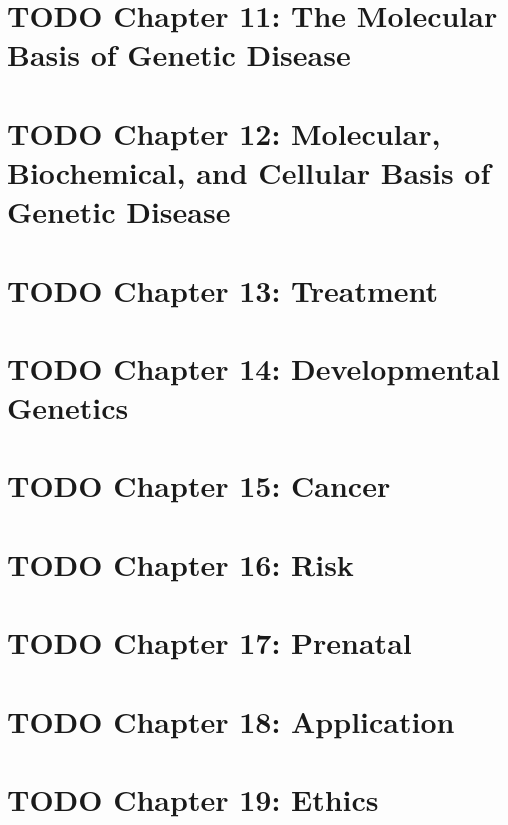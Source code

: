 \documentclass{scrartcl}
\begin{document}
\section{{\bfseries\sffamily TODO} Chapter 11: The Molecular Basis of Genetic Disease}
\label{sec:org085050b}
\section{{\bfseries\sffamily TODO} Chapter 12: Molecular, Biochemical, and Cellular Basis of Genetic Disease}
\label{sec:org5de3e22}
\section{{\bfseries\sffamily TODO} Chapter 13: Treatment}
\label{sec:orgb409f19}
\section{{\bfseries\sffamily TODO} Chapter 14: Developmental Genetics}
\label{sec:orgcb04602}
\section{{\bfseries\sffamily TODO} Chapter 15: Cancer}
\label{sec:org87b5d3f}
\section{{\bfseries\sffamily TODO} Chapter 16: Risk}
\label{sec:orgc0999e6}
\section{{\bfseries\sffamily TODO} Chapter 17: Prenatal}
\label{sec:org24ae17d}
\section{{\bfseries\sffamily TODO} Chapter 18: Application}
\label{sec:org322b95c}
\section{{\bfseries\sffamily TODO} Chapter 19: Ethics}
\label{sec:org6c483d0}
\end{document}
